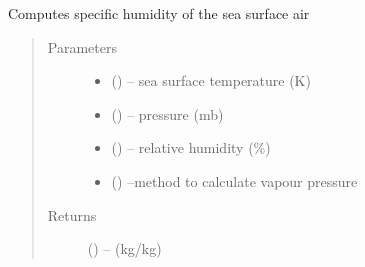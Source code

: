 \documentclass[letterpaper,10pt,english]{sphinxmanual}
\begin{document}
\begin{fulllineitems}
\label{\detokenize{index:hum_subs.qsat_air}}
Computes specific humidity of the  sea surface air
\begin{quote}\begin{description}
\item[{Parameters}] \leavevmode\begin{itemize}
\item {} 
 (\href{https://docs.python.org/3/library/functions.html\#float}{}) -- sea surface temperature (K)

\item {} 
 (\href{https://docs.python.org/3/library/functions.html\#float}{}) -- pressure (mb)

\item {} 
 (\href{https://docs.python.org/3/library/functions.html\#float}{}) -- relative humidity (\%)

\item {} 
 (\href{https://docs.python.org/3/library/functions.html\#str}{}) --method to calculate vapour pressure

\end{itemize}

\item[{Returns}] \leavevmode
{} (\href{https://docs.python.org/3/library/functions.html\#float}{}) -- (kg/kg)

\end{description}\end{quote}

\end{fulllineitems}

\end{document}
